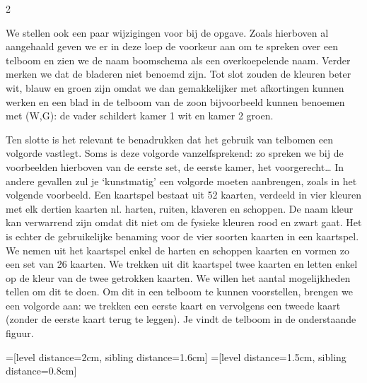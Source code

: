 \begin{multicols}{2}

We stellen ook een paar wijzigingen voor bij de opgave. Zoals hierboven al aangehaald geven we er in deze loep de voorkeur aan om te spreken over een telboom en zien we de naam boomschema als een overkoepelende naam. Verder merken we dat de bladeren niet benoemd zijn. Tot slot zouden de kleuren beter wit, blauw en groen zijn omdat we dan gemakkelijker met afkortingen kunnen werken en een blad in de telboom van de zoon bijvoorbeeld kunnen benoemen met (W,G): de vader schildert kamer 1 wit en kamer 2 groen.

Ten slotte is het relevant te benadrukken dat het gebruik van telbomen een volgorde vastlegt. Soms is deze volgorde vanzelfsprekend: zo spreken we bij de voorbeelden hierboven van de eerste set, de eerste kamer, het voorgerecht… In andere gevallen zul je ‘kunstmatig’ een volgorde moeten aanbrengen, zoals in het volgende voorbeeld. Een kaartspel bestaat uit 52 kaarten, verdeeld in vier kleuren met elk dertien kaarten nl. harten, ruiten, klaveren en schoppen. De naam kleur kan verwarrend zijn omdat dit niet om de fysieke kleuren rood en zwart gaat. Het is echter de gebruikelijke benaming voor de vier soorten kaarten in een kaartspel. We nemen uit het kaartspel enkel de harten en schoppen kaarten en vormen zo een set van 26 kaarten. We trekken uit dit kaartspel twee kaarten en letten enkel op de kleur van de twee getrokken kaarten. We willen het aantal mogelijkheden tellen om dit te doen. Om dit in een telboom te kunnen voorstellen, brengen we een volgorde aan: we trekken een eerste kaart en vervolgens een tweede kaart (zonder de eerste kaart terug te leggen). Je vindt de telboom in de onderstaande figuur.

\begin{afbeeldingenv}
=[level distance=2cm, sibling distance=1.6cm]
=[level distance=1.5cm, sibling distance=0.8cm]


\end{afbeeldingenv}
\end{multicols}
